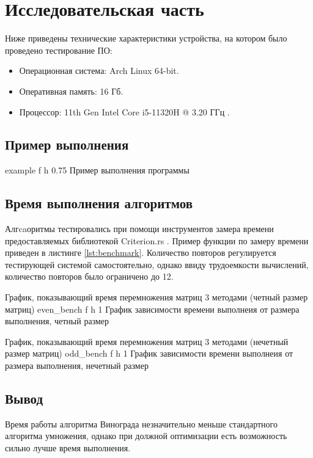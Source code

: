 \chapter{Исследовательская часть}
Ниже приведены технические характеристики устройства, на котором было проведено тестирование ПО:

\begin{itemize}
    \item Операционная система: Arch Linux \cite{arch} 64-bit.
    \item Оперативная память: 16 Гб.
    \item Процессор: 11th Gen Intel\textsuperscript{\tiny\textregistered} Core\textsuperscript{\tiny\texttrademark} i5-11320H @ 3.20 ГГц \cite{i5}.
\end{itemize}

\section{Пример выполнения}
{example} %
{f} %
{h} %
{0.75\textwidth} %
{Пример выполнения программы} %
\clearpage

\section{Время выполнения алгоритмов}
Алгcaоритмы тестировались при помощи инструментов замера времени предоставляемых библиотекой Criterion.rs \cite{Criterion}.
Пример функции по замеру времени приведен в листинге \ref{lst:benchmark}.
Количество повторов регулируется тестирующей системой самостоятельно, однако ввиду трудоемкости вычислений, количество повторов было ограничено до 12.


\newpage
График, показывающий время перемножения матриц 3 методами (четный размер матриц)\newline
{}
{even_bench} %
{f} %
{h} %
{1\textwidth} %
{График зависимости времени выполнеия от размера выполнения, четный размер} %
\newpage

График, показывающий время перемножения матриц 3 методами (нечетный размер матриц)\newline
{}
{odd_bench} %
{f} %
{h} %
{1\textwidth} %
{График зависимости времени выполнеия от размера выполнения, нечетный размер} %

\section*{Вывод}

Время работы алгоритма Винограда незначительно меньше стандартного алгоритма умножения, однако при должной оптимизации есть возможность сильно лучше время выполнения.